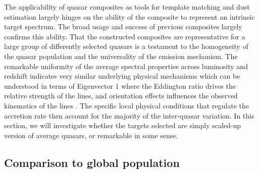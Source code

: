 \documentclass{aa}    %
\newcommand{\sectlabel}[1]{\label{sect:#1}}
\begin{document}
The applicability of quasar composites as tools for template matching
and dust estimation largely hinges on the ability of the composite to
represent an intrinsic target spectrum. The broad usage and success of
previous composites largely confirms this ability. That the
constructed composites are representative for a large group of
differently selected quasars is a testament to the homogeneity of the
quasar population and the universality of the emission mechanism.  The
remarkable uniformity of the average spectral properties across
luminosity and redshift indicates very similar underlying physical
mechanisms which can be understood in terms of Eigenvector 1
\citep{Boroson1992, Francis1992} where the Eddington ratio drives the
relative strength of the lines, and orientation effects influences the
observed kinematics of the lines \citep{Shen2014a}. The specific local
physical conditions that regulate the accretion rate then account for
the majority of the inter-quasar variation. In this section, we will
investigate whether the targets selected are simply scaled-up version
of average quasars, or remarkable in some sense.



\subsection{Comparison to global population}  \sectlabel{parents}
\end{document}

